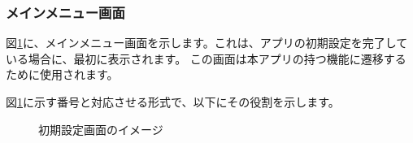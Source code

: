 \documentclass[a4j]{jarticle}
\begin{document}
\subsubsection{メインメニュー画面}
図\ref{honjo_main}に、メインメニュー画面を示します。これは、アプリの初期設定を完了している場合に、最初に表示されます。
この画面は本アプリの持つ機能に遷移するために使用されます。

図\ref{honjo_main}に示す番号と対応させる形式で、以下にその役割を示します。

\begin{figure}[H]
    \begin{center}
    \caption {初期設定画面のイメージ}
    \label{honjo_main}
    \end{center}
\end{figure}
\end{document}
